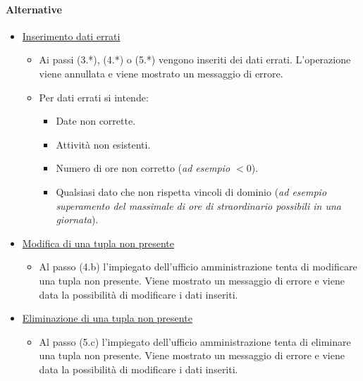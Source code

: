 \paragraph{Alternative}
\begin{itemize}
	\item \underline{Inserimento dati errati}
		\begin{itemize}
			\item Ai passi (3.*), (4.*) o (5.*) vengono inseriti dei dati errati. L'operazione viene annullata e viene mostrato un messaggio di errore.
			\item Per dati errati si intende:
				\begin{itemize}
					\item Date non corrette.
					\item Attività non esistenti.
					\item Numero di ore non corretto (\textit{ad esempio $<0$}).
					\item Qualsiasi dato che non rispetta vincoli di dominio (\textit{ad esempio superamento del massimale di ore di straordinario possibili in una giornata}).
				\end{itemize}
		\end{itemize}
	\item \underline{Modifica di una tupla non presente}
		\begin{itemize}
			\item Al passo (4.b) l'impiegato dell'ufficio amministrazione tenta di modificare una tupla non presente. Viene mostrato un messaggio di errore e viene data la possibilità di modificare i dati inseriti.
		\end{itemize}
	\item \underline{Eliminazione di una tupla non presente}
		\begin{itemize}
			\item Al passo (5.c) l'impiegato dell'ufficio amministrazione tenta di eliminare una tupla non presente. Viene mostrato un messaggio di errore e viene data la possibilità di modificare i dati inseriti.
		\end{itemize}
\end{itemize}
